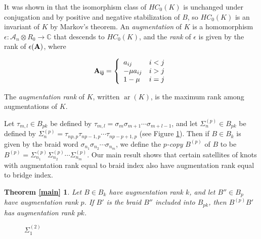 \documentclass[11pt]{amsart}
\def\C{{\mathbb C}}
\def\A{{\mathcal A}}
\def\s{{\sigma}}
\def\ar{\operatorname{ar}}
\newcommand\Sp{\Sigma^{(p)}}
\begin{document}
It was shown in \cite{Ng08} that the isomorphism class of $HC_0(K)$ is unchanged under conjugation and by positive and negative stabilization of $B$, so $HC_0(K)$ is an invariant of $K$ by Markov's theorem.  An \emph{augmentation} of $K$ is a homomorphism $\epsilon\colon \A_n\otimes R_0\rightarrow \C$ that descends to $HC_0(K)$, and the \emph{rank} of $\epsilon$ is given by the rank of $\epsilon({\bf A})$, where

 \begin{equation*}
  \bf{A}_{ij} = 
  \left\{
       \begin{array}{lr}
        a_{ij} & i<j\\
        -\mu a_{ij} & i>j\\
        1-\mu & i = j\\
       \end{array}
  \right.
  \end{equation*}
  
The \emph{augmentation rank} of $K$, written $\ar(K)$, is the maximum rank among augmentations of $K$.  

Let $\tau_{m,l} \in B_{pk}$ be defined by $\tau_{m,l} = \s_m\s_{m+1}\cdots\s_{m+l-1}$, and let $\Sp_n\in B_{pk}$ be defined by $\Sp_n = \tau_{np,p}\tau_{np-1,p}\cdots\tau_{np-p+1,p}$ (see Figure \ref{FigSigma2}).  Then if $B\in B_k$ is given by the braid word $\s_{n_1}\s_{n_2}\cdots\s_{n_m}$, we define the \emph{$p$-copy} $B^{(p)}$ of $B$ to be $B^{(p)} = \Sp_{n_1}\Sp_{n_2}\cdots\Sp_{n_m}$.  Our main result shows that certain satellites of knots with augmentation rank equal to braid index also have augmentation rank equal to bridge index.

\newtheorem*{main}{Theorem \ref{main}}
\begin{main}
Let $B\in B_k$ have augmentation rank $k$, and let $B''\in B_p$ have augmentation rank $p$.  If $B'$ is the braid $B''$ included into $B_{pk}$, then $B^{(p)}B'$ has augmentation rank $pk$.
\end{main}

\begin{figure}[ht]
\caption{$\Sigma^{(2)}_1$}
\label{FigSigma2}
\end{figure}
\end{document}

